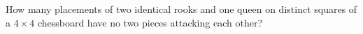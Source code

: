 How many placements of two identical rooks and one queen on distinct squares of a $4\times4$ chessboard have no two pieces attacking each other?

